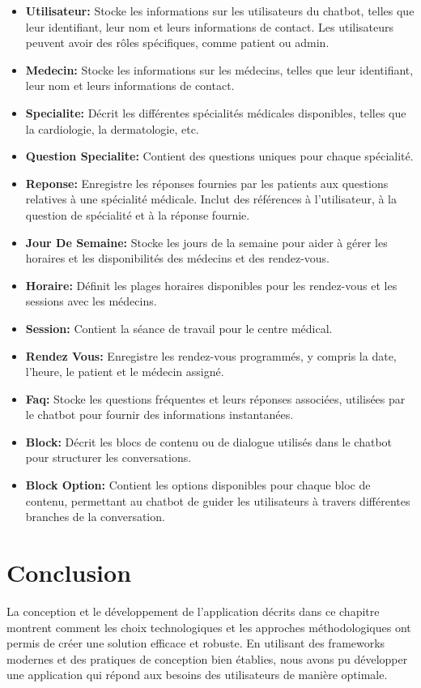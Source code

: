 \begin{itemize}
  \item \textbf{Utilisateur: }Stocke les informations sur les utilisateurs du chatbot, telles que leur identifiant, leur nom et leurs informations de contact. Les utilisateurs peuvent avoir des rôles spécifiques, comme patient ou admin.
  \item \textbf{Medecin: }Stocke les informations sur les médecins, telles que leur identifiant, leur nom et leurs informations de contact.
  \item \textbf{Specialite: }Décrit les différentes spécialités médicales disponibles, telles que la cardiologie, la dermatologie, etc.
  \item \textbf{Question Specialite: }Contient des questions uniques pour chaque spécialité.
  \item \textbf{Reponse: }Enregistre les réponses fournies par les patients aux questions relatives à une spécialité médicale. Inclut des références à l'utilisateur, à la question de spécialité et à la réponse fournie.
  \item \textbf{Jour De Semaine: }Stocke les jours de la semaine pour aider à gérer les horaires et les disponibilités des médecins et des rendez-vous.
  \item \textbf{Horaire: }Définit les plages horaires disponibles pour les rendez-vous et les sessions avec les médecins.
  \item \textbf{Session: }Contient la séance de travail pour le centre médical.
  \item \textbf{Rendez Vous: }Enregistre les rendez-vous programmés, y compris la date, l'heure, le patient et le médecin assigné.
  \item \textbf{Faq: }Stocke les questions fréquentes et leurs réponses associées, utilisées par le chatbot pour fournir des informations instantanées.
  \item \textbf{Block: }Décrit les blocs de contenu ou de dialogue utilisés dans le chatbot pour structurer les conversations.
  \item \textbf{Block Option: }Contient les options disponibles pour chaque bloc de contenu, permettant au chatbot de guider les utilisateurs à travers différentes branches de la conversation.
\end{itemize}



\newpage

\section*{Conclusion}

\hspace{16pt}La conception et le développement de l'application décrits dans ce chapitre montrent comment les choix technologiques et les approches méthodologiques ont permis de créer une solution efficace et robuste. En utilisant des frameworks modernes et des pratiques de conception bien établies, nous avons pu développer une application qui répond aux besoins des utilisateurs de manière optimale.

\pagebreak
